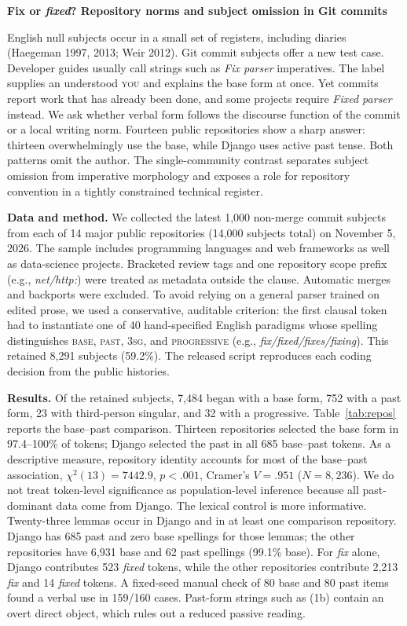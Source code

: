 \documentclass[12pt]{article}
\newcommand{\ex}[1]{\textit{#1}}
\begin{document}
\begin{center}
{\bfseries Fix or \textit{fixed}? Repository norms and subject omission in Git commits}
\end{center}
\vspace{-0.65em}

English null subjects occur in a small set of registers, including diaries
(Haegeman 1997, 2013; Weir 2012). Git commit subjects offer a new test case.
Developer guides usually call strings such as \ex{Fix parser} imperatives. The
label supplies an understood \textsc{you} and explains the base form at once.
Yet commits report work that has already been done, and some projects require
\ex{Fixed parser} instead. We ask whether verbal form follows the discourse
function of the commit or a local writing norm. Fourteen public repositories
show a sharp answer: thirteen overwhelmingly use the base, while Django uses
active past tense. Both patterns omit the author. The single-community contrast
separates subject omission from imperative morphology and exposes a role for
repository convention in a tightly constrained technical register.

\textbf{Data and method.}
We collected the latest 1,000 non-merge commit subjects from each of 14 major
public repositories (14,000 subjects total) on November 5, 2026. The sample
includes programming languages and web frameworks as well as data-science projects.
Bracketed review tags and one repository scope prefix (e.g.,
\ex{net/http:}) were treated as metadata outside the clause. Automatic merges
and backports were excluded. To avoid relying on a general
parser trained on edited prose, we used a conservative, auditable
criterion: the first clausal token had to instantiate one of 40 hand-specified
English paradigms whose spelling distinguishes \textsc{base}, \textsc{past},
\textsc{3sg}, and \textsc{progressive} (e.g., \ex{fix/fixed/fixes/fixing}).
This retained 8,291 subjects (59.2\%). The released script reproduces each
coding decision from the public histories.

\textbf{Results.}
Of the retained subjects, 7,484 began with a base form, 752 with a past form,
23 with third-person singular, and 32 with a progressive. Table~\ref{tab:repos}
reports the base--past comparison. Thirteen repositories selected the
base form in 97.4--100\% of tokens; Django selected the past in all 685
base--past tokens. As a descriptive measure, repository identity accounts for
most of the base--past association, $\chi^2(13)=7442.9$, $p<.001$, Cramer's
$V=.951$ ($N=8{,}236$). We do not treat token-level significance as
population-level inference because all past-dominant data come from Django.
The lexical control is more informative. Twenty-three lemmas occur in Django
and in at least one comparison repository. Django has 685 past and zero base
spellings for those lemmas; the other repositories have 6,931 base and 62 past
spellings (99.1\% base). For \textit{fix} alone, Django contributes 523
\ex{fixed} tokens, while the other repositories contribute 2,213 \ex{fix} and
14 \ex{fixed} tokens. A fixed-seed manual check of 80 base and 80 past items
found a verbal use in 159/160 cases. Past-form strings such as (1b) contain an
overt direct object, which rules out a reduced passive reading.
\end{document}
